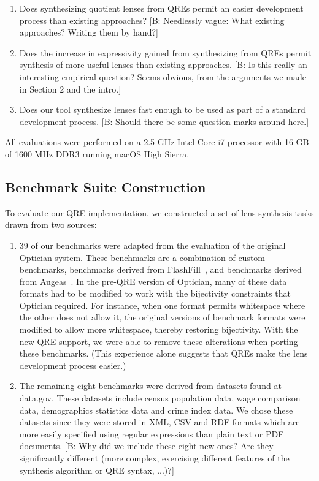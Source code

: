 \documentclass[acmsmall,review,anonymous]{acmart}
\newcommand{\FINISH}[3]{\ifdraft\textcolor{#1}{[#2: #3]}\fi}
\newcommand{\bcp}[1]{\FINISH{dkred}{B}{#1}}
\begin{document}
\begin{enumerate}
  \item Does synthesizing quotient lenses from QREs permit an easier development
  process than existing approaches?  \bcp{Needlessly vague: What existing approaches?  Writing
  them by hand?}
  
  \item Does the increase in expressivity gained from synthesizing from QREs
  permit synthesis of more useful lenses than existing approaches.  \bcp{Is
    this really an interesting empirical question?  Seems obvious, from the
    arguments we made in Section 2 and the intro.}
  
  \item Does our tool synthesize lenses fast enough to be used as part of a
  standard development process.  \bcp{Should there be some question marks
    around here.}
\end{enumerate}

All evaluations were performed on a 2.5 GHz Intel Core i7 processor with 16 GB
of 1600 MHz DDR3 running macOS High Sierra.


\subsection{Benchmark Suite Construction}

To evaluate our QRE implementation, we constructed a set of lens synthesis tasks
drawn from two sources:
\begin{enumerate}
\item 39 of our benchmarks were adapted from the evaluation of the original
  Optician system.  These benchmarks are a combination of custom benchmarks,
  benchmarks derived from FlashFill~\cite{flashfill}, and benchmarks
  derived from Augeas~\cite{augeas2}. In the pre-QRE version of
  Optician, many of these data formats had to be modified to work with the
  bijectivity constraints that Optician required.  For instance, when one format
  permits whitespace where the other does not allow it, the original versions of
  benchmark formats were modified to allow more whitespace, thereby restoring
  bijectivity.  With the new QRE support, we were able to remove these
  alterations when porting these benchmarks.  (This experience alone suggests
  that QREs make the lens development process easier.)
  
\item The remaining eight benchmarks were derived from datasets found at 
  data.gov. These datasets include census
  population data, wage comparison data, demographics statistics data and
  crime index data. We chose these datasets since they were stored in XML, CSV
  and RDF formats which are more easily specified using regular expressions than
  plain text or PDF documents.  \bcp{Why did we include these eight new
    ones?  Are they significantly different (more complex, exercising
    different features of the synthesis algorithm or QRE syntax, ...)?}
\end{enumerate}
\end{document}
